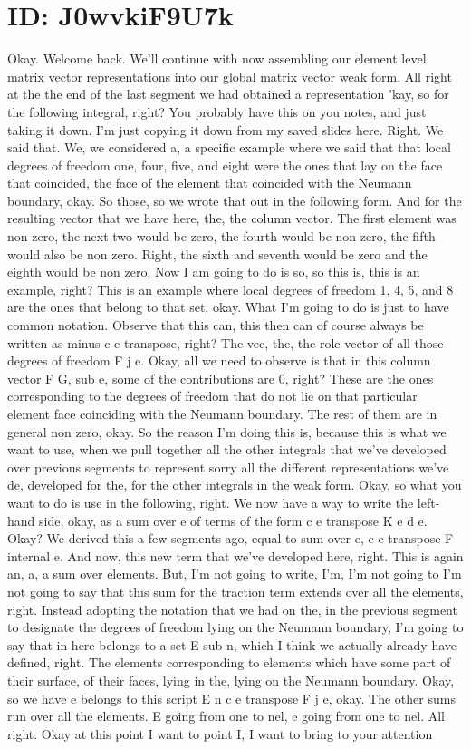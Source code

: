 \documentclass[10pt]{article}
\begin{document}
\section*{ID: J0wvkiF9U7k}
Okay. Welcome back. We'll continue with now assembling our element level matrix vector representations into our global matrix vector weak form. All right at the the end of the last segment we had obtained a representation 'kay, so for the following integral, right? You probably have this on you notes, and just taking it down. I'm just copying it down from my saved slides here. Right. We said that. We, we considered a, a specific example where we said that that local degrees of freedom one, four, five, and eight were the ones that lay on the face that coincided, the face of the element that coincided with the Neumann boundary, okay. So those, so we wrote that out in the following form. And for the resulting vector that we have here, the, the column vector. The first element was non zero, the next two would be zero, the fourth would be non zero, the fifth would also be non zero. Right, the sixth and seventh would be zero and the eighth would be non zero. Now I am going to do is so, so this is, this is an example, right? This is an example where local degrees of freedom 1, 4, 5, and 8 are the ones that belong to that set, okay. What I'm going to do is just to have common notation. Observe that this can, this then can of course always be written as minus c e transpose, right? The vec, the, the role vector of all those degrees of freedom F j e. Okay, all we need to observe is that in this column vector F G, sub e, some of the contributions are 0, right? These are the ones corresponding to the degrees of freedom that do not lie on that particular element face coinciding with the Neumann boundary. The rest of them are in general non zero, okay. So the reason I'm doing this is, because this is what we want to use, when we pull together all the other integrals that we've developed over previous segments to represent sorry all the different representations we've de, developed for the, for the other integrals in the weak form. Okay, so what you want to do is use in the following, right. We now have a way to write the left-hand side, okay, as a sum over e of terms of the form c e transpose K e d e. Okay? We derived this a few segments ago, equal to sum over e, c e transpose F internal e. And now, this new term that we've developed here, right. This is again an, a, a sum over elements. But, I'm not going to write, I'm, I'm not going to I'm not going to say that this sum for the traction term extends over all the elements, right. Instead adopting the notation that we had on the, in the previous segment to designate the degrees of freedom lying on the Neumann boundary, I'm going to say that in here belongs to a set E sub n, which I think we actually already have defined, right. The elements corresponding to elements which have some part of their surface, of their faces, lying in the, lying on the Neumann boundary. Okay, so we have e belongs to this script E n c e transpose F j e, okay. The other sums run over all the elements. E going from one to nel, e going from one to nel. All right. Okay at this point I want to point I, I want to bring to your attention 
\end{document}
